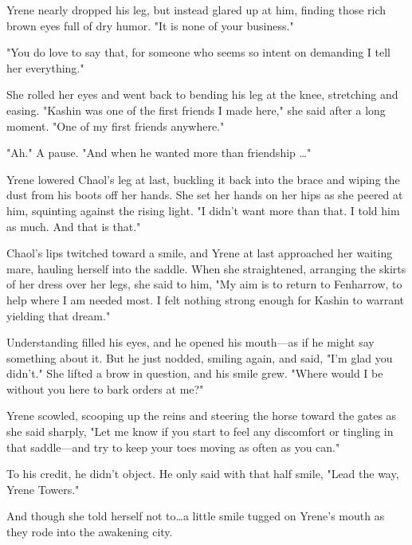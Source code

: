 Yrene nearly dropped his leg, but instead glared up at him, finding those rich brown eyes full of dry humor.
"It is none of your business."

"You do love to say that, for someone who seems so intent on demanding I tell her everything."

She rolled her eyes and went back to bending his leg at the knee, stretching and easing.
"Kashin was one of the first friends I made here," she said after a long moment.
"One of my first friends anywhere."

"Ah."
A pause.
"And when he wanted more than friendship \ldots"

Yrene lowered Chaol's leg at last, buckling it back into the brace and wiping the dust from his boots off her hands.
She set her hands on her hips as she peered at him, squinting against the rising light.
"I didn't want more than that.
I told him as much.
And that is that."

Chaol's lips twitched toward a smile, and Yrene at last approached her waiting mare, hauling herself into the saddle.
When she straightened, arranging the skirts of her dress over her legs, she said to him, "My aim is to return to Fenharrow, to help where I am needed most.
I felt nothing strong enough for Kashin to warrant yielding that dream."

Understanding filled his eyes, and he opened his mouth---as if he might say something about it.
But he just nodded, smiling again, and said, "I'm glad you didn't."
She lifted a brow in question, and his smile grew.
"Where would I be without you here to bark orders at me?"

Yrene scowled, scooping up the reins and steering the horse toward the gates as she said sharply, "Let me know if you start to feel any discomfort or tingling in that saddle---and try to keep your toes moving as often as you can."

To his credit, he didn't object.
He only said with that half smile, "Lead the way, Yrene Towers."

And though she told herself not to\ldots a little smile tugged on Yrene's mouth as they rode into the awakening city.

